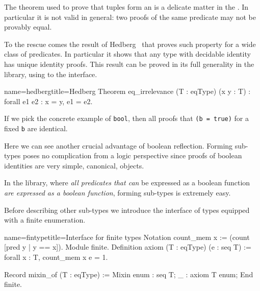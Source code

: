 
The  theorem used to prove that tuples form an
 is a delicate matter in the \mcbCIC{}.  In particular it
is not valid in general: two proofs of the same predicate may not be
provably equal.

To the rescue comes the result of Hedberg~\cite{Hedberg}
that proves such property for a wide class of predicates.
In particular it shows that any type with decidable identity
has unique identity proofs. This result can be proved in its full generality
in the \mcbMC{} library, using to the  interface.

\begin{coq}{name=hedberg}{title=Hedberg}
Theorem eq_irrelevance (T : eqType) (x y : T) : forall e1 e2 : x = y, e1 = e2.
\end{coq}

If we pick the concrete example of \lstinline/bool/,
then all proofs that \lstinline/(b = true)/
for a fixed \lstinline/b/ are identical.

Here we can see another crucial advantage of boolean reflection.
Forming sub-types poses no complication from a logic perspective since
proofs of boolean identities are very simple, canonical, objects.

In the \mcbMC{} library, where \emph{all predicates that can} be
expressed as a boolean function \emph{are expressed as a boolean
function}, forming sub-types is extremely easy.


\mcbLEARN{}
\mcbNOTES{}

Before describing other sub-types we introduce the interface of
types equipped with a finite enumeration.

\begin{coq}{name=fintype}{title=Interface for finite types}
Notation count_mem x := (count [pred y | y == x]).
Module finite.
Definition axiom (T : eqType) (e : seq T) :=
  forall x : T, count_mem x e = 1.

Record mixin_of (T : eqType) := Mixin {
  enum : seq T;
  _ : axiom T enum;
}
End finite.
\end{coq}

